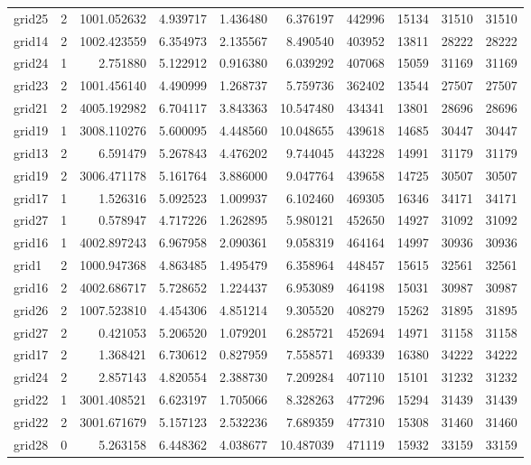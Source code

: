 \begin{longtable}{|l|r|r|r|r|r|r|r|r|r|}
grid25 & 2 & 1001.052632 & 4.939717 & 1.436480 & 6.376197 & 442996 & 15134 & 31510 & 31510 \\
grid14 & 2 & 1002.423559 & 6.354973 & 2.135567 & 8.490540 & 403952 & 13811 & 28222 & 28222 \\
grid24 & 1 & 2.751880 & 5.122912 & 0.916380 & 6.039292 & 407068 & 15059 & 31169 & 31169 \\
grid23 & 2 & 1001.456140 & 4.490999 & 1.268737 & 5.759736 & 362402 & 13544 & 27507 & 27507 \\
grid21 & 2 & 4005.192982 & 6.704117 & 3.843363 & 10.547480 & 434341 & 13801 & 28696 & 28696 \\
grid19 & 1 & 3008.110276 & 5.600095 & 4.448560 & 10.048655 & 439618 & 14685 & 30447 & 30447 \\
grid13 & 2 & 6.591479 & 5.267843 & 4.476202 & 9.744045 & 443228 & 14991 & 31179 & 31179 \\
grid19 & 2 & 3006.471178 & 5.161764 & 3.886000 & 9.047764 & 439658 & 14725 & 30507 & 30507 \\
grid17 & 1 & 1.526316 & 5.092523 & 1.009937 & 6.102460 & 469305 & 16346 & 34171 & 34171 \\
grid27 & 1 & 0.578947 & 4.717226 & 1.262895 & 5.980121 & 452650 & 14927 & 31092 & 31092 \\
grid16 & 1 & 4002.897243 & 6.967958 & 2.090361 & 9.058319 & 464164 & 14997 & 30936 & 30936 \\
grid1 & 2 & 1000.947368 & 4.863485 & 1.495479 & 6.358964 & 448457 & 15615 & 32561 & 32561 \\
grid16 & 2 & 4002.686717 & 5.728652 & 1.224437 & 6.953089 & 464198 & 15031 & 30987 & 30987 \\
grid26 & 2 & 1007.523810 & 4.454306 & 4.851214 & 9.305520 & 408279 & 15262 & 31895 & 31895 \\
grid27 & 2 & 0.421053 & 5.206520 & 1.079201 & 6.285721 & 452694 & 14971 & 31158 & 31158 \\
grid17 & 2 & 1.368421 & 6.730612 & 0.827959 & 7.558571 & 469339 & 16380 & 34222 & 34222 \\
grid24 & 2 & 2.857143 & 4.820554 & 2.388730 & 7.209284 & 407110 & 15101 & 31232 & 31232 \\
grid22 & 1 & 3001.408521 & 6.623197 & 1.705066 & 8.328263 & 477296 & 15294 & 31439 & 31439 \\
grid22 & 2 & 3001.671679 & 5.157123 & 2.532236 & 7.689359 & 477310 & 15308 & 31460 & 31460 \\
grid28 & 0 & 5.263158 & 6.448362 & 4.038677 & 10.487039 & 471119 & 15932 & 33159 & 33159 \\

\end{longtable}
